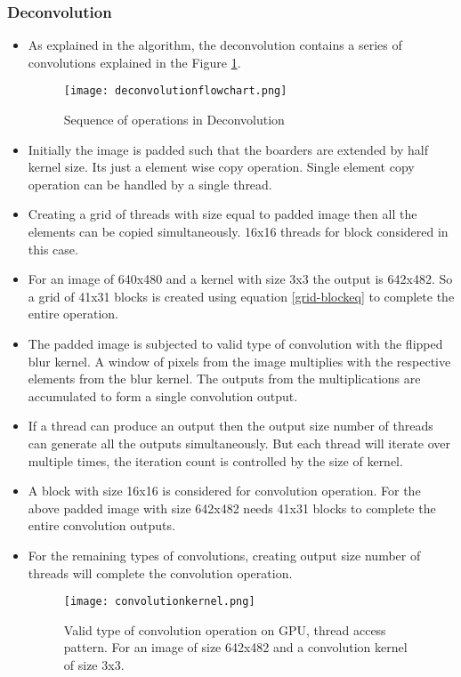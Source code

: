 \subsubsection{Deconvolution}
\begin{itemize}
	\item As explained in the algorithm, the deconvolution contains a series of convolutions explained in the Figure \ref{fig:Deconvolution flow chart}.
	\begin{figure}[h!]
		\centering
		\texttt{[image: deconvolutionflowchart.png]}
		\caption{Sequence of operations in Deconvolution}
		\label{fig:Deconvolution flow chart}
	\end{figure}
	\item Initially the image is padded such that the boarders are extended by half kernel size. Its just a element wise copy operation. Single element copy operation can be handled by a single thread. 
	\item Creating a grid of threads with size equal to padded image then all the elements can be copied simultaneously. 16x16 threads for block considered in this case.
	\item For an image of 640x480 and a kernel with size 3x3 the output is 642x482. So a grid of 41x31 blocks is created using equation \ref{grid-blockeq} to complete the entire operation.
	\item The padded image is subjected to valid type of convolution with the flipped blur kernel. A window of pixels from the image multiplies with the respective elements from the blur kernel. The outputs from the multiplications are accumulated to form a single convolution output.
	\item If a thread can produce an output then the output size number of threads can generate all the outputs simultaneously. But each thread will iterate over multiple times, the iteration count is controlled by the size of kernel.
	\item A block with size 16x16 is considered for convolution operation. For the above padded image with size 642x482 needs 41x31 blocks to complete the entire convolution outputs.
	\item For the remaining types of convolutions, creating output size number of threads will complete the convolution operation.
	\begin{figure}[h!]
		\centering
		\texttt{[image: convolutionkernel.png]}
		\caption{Valid type of convolution operation on GPU, thread access pattern. For an image of size 642x482 and a convolution kernel of size 3x3.}

\end{figure}
\end{itemize}
